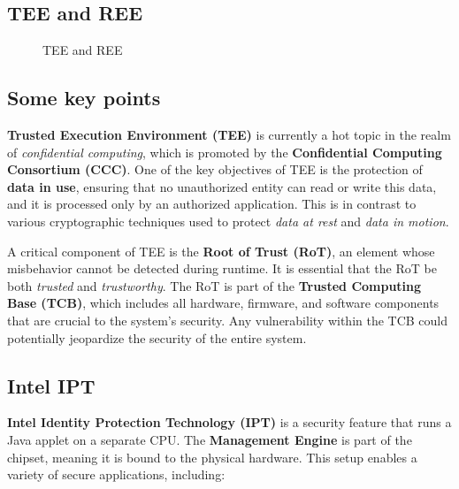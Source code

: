 \subsection{TEE and REE}
\begin{figure}[h]
    \centering
    \caption{TEE and REE}
    \label{fig:tee_ree}
\end{figure}

\subsection{Some key points}
\textbf{Trusted Execution Environment (TEE)} is currently a hot topic in the realm of \textit{confidential computing}, which is promoted by the \textbf{Confidential Computing Consortium (CCC)}. One of the key objectives of TEE is the protection of \textbf{data in use}, ensuring that no unauthorized entity can read or write this data, and it is processed only by an authorized application. This is in contrast to various cryptographic techniques used to protect \textit{data at rest} and \textit{data in motion}. \bigskip

A critical component of TEE is the \textbf{Root of Trust (RoT)}, an element whose misbehavior cannot be detected during runtime. It is essential that the RoT be both \textit{trusted} and \textit{trustworthy}. The RoT is part of the \textbf{Trusted Computing Base (TCB)}, which includes all hardware, firmware, and software components that are crucial to the system's security. Any vulnerability within the TCB could potentially jeopardize the security of the entire system.

\subsection{Intel IPT}

\textbf{Intel Identity Protection Technology (IPT)} is a security feature that runs a Java applet on a separate CPU. The \textbf{Management Engine} is part of the chipset, meaning it is bound to the physical hardware. This setup enables a variety of secure applications, including:

